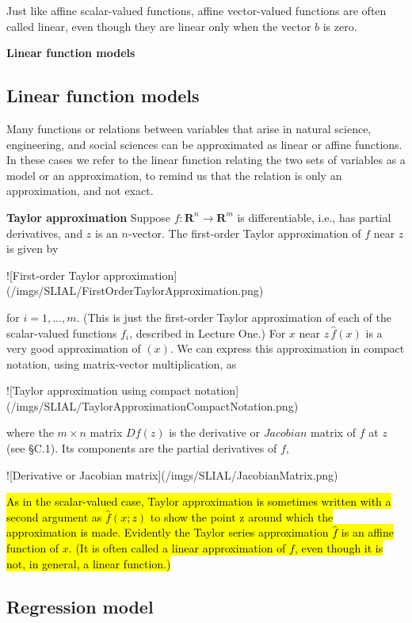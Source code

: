 \documentclass[11pt,oneside,a4paper,openright]{article}
\begin{document}
Just like affine scalar-valued functions, affine vector-valued functions are often called linear, even though they are linear only when the vector $b$ is zero.

\textbf{Linear function models}

\subsection*{Linear function models}

Many functions or relations between variables that arise in natural science, engineering, and social sciences can be approximated as linear or affine functions. In these cases we refer to the linear function relating the two sets of variables as a model or an approximation, to remind us that the relation is only an approximation, and not exact.

\textbf{Taylor approximation}
Suppose $f : \textbf{R}^n → \textbf{R}^m$ is differentiable, i.e., has partial derivatives, and $z$ is an $n$-vector. The first-order Taylor approximation of $f$ near $z$ is given by

![First-order Taylor approximation](/imgs/SLIAL/FirstOrderTaylorApproximation.png)

for $i = 1, ..., m$. (This is just the first-order Taylor approximation of each of the scalar-valued functions $f_i$, described in Lecture One.) For $x$ near $z\, \hat{f}(x)$ is a very good approximation of $(x)$. We can express this approximation in compact notation, using matrix-vector multiplication, as

![Taylor approximation using compact notation](/imgs/SLIAL/TaylorApproximationCompactNotation.png)

where the $m×n$ matrix $Df(z)$ is the derivative or $Jacobian$ matrix of $f$ at $z$ (see §C.1). Its components are the partial derivatives of $f$,

![Derivative or Jacobian matrix](/imgs/SLIAL/JacobianMatrix.png)

\hl{As in the scalar-valued case, Taylor approximation is sometimes written with a second argument as $\hat{f}(x; z)$ to show the point z around which the approximation is made. Evidently the Taylor series approximation $\hat{f}$ is an affine function of $x$. (It is often called a linear approximation of $f$, even though it is not, in general, a linear function.)}

\subsection*{Regression model}
\end{document}
